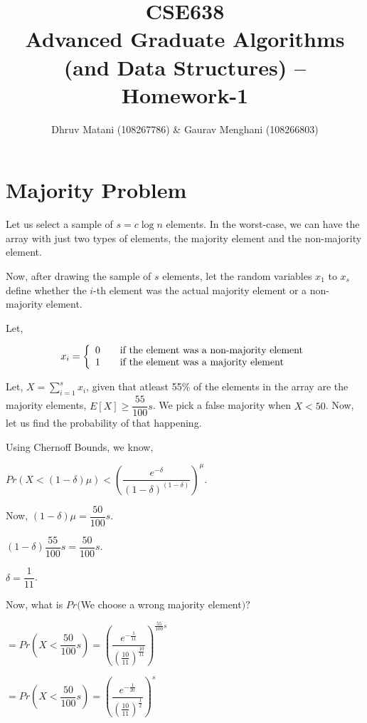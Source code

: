 \documentclass{article}
\title{CSE638 \\ Advanced Graduate Algorithms (and Data Structures) -- Homework-1}
\author{Dhruv Matani (108267786) \& Gaurav Menghani (108266803)}
\begin{document}
\maketitle

\clearpage

\tableofcontents

\clearpage


\section{Majority Problem}
Let us select a sample of $s = c\log{n}$ elements. In the worst-case, we can
have the array with just two types of elements, the majority element and the
non-majority element.

Now, after drawing the sample of $s$ elements, let the random variables
$x_{1}$ to $x_{s}$ define whether the $i$-th element was the actual majority
element or a non-majority element.

Let,

\[
  x_{i} = \left\{
  \begin{array}{l l}
    0 & \quad \text{if the element was a non-majority element}\\
    1 & \quad \text{if the element was a majority element}\\
  \end{array}
  \right.
\]

Let, $X = \displaystyle\sum\limits_{i=1}^s{x_{i}}$,
given that atleast 55\% of the elements in the array are the majority elements,
$E[X] \geq \dfrac{55}{100}s$. We pick a false majority when $X < 50$. Now,
let us find the probability of that happening.

Using Chernoff Bounds, we know,

$Pr(X < (1-\delta)\mu) < \left(\dfrac{e^{-\delta}}{(1-\delta)^{(1-\delta)}}\right)^\mu$.

Now, $(1-\delta)\mu = \dfrac{50}{100}s$.

$(1-\delta)\dfrac{55}{100}s = \dfrac{50}{100}s$.

$\delta = \dfrac{1}{11}$.

Now, what is $Pr($We choose a wrong majority element$)?$

$ = Pr(X < \dfrac{50}{100}s) = \left(\dfrac{e^{-\frac{1}{11}}}{(\frac{10}{11})^{\frac{10}{11}}}\right)^{\frac{55}{100}s}$

$ = Pr(X < \dfrac{50}{100}s) = \left(\dfrac{e^{-\frac{1}{20}}}{(\frac{10}{11})^{\frac{1}{2}}}\right)^s$
\end{document}
